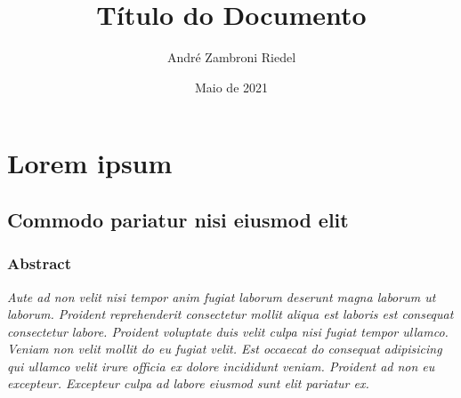 \documentclass[12pt]{report}
\begin{document}



\thispagestyle{empty}

\title{\textbf{{\Huge Título do Documento}}}
\author{André Zambroni Riedel}
\date{Maio de 2021}

\maketitle
\newpage



\tableofcontents
\newpage

\listoffigures
\newpage

\listoftables
\newpage


\setcounter{page}{1}

\part{Lorem ipsum}

\chapter{Commodo pariatur nisi eiusmod elit}

\singlespacing
\section*{Abstract}
\noindent
\textit{
    Aute ad non velit nisi tempor anim fugiat laborum deserunt magna laborum ut laborum. Proident reprehenderit consectetur mollit aliqua est laboris est consequat consectetur labore. Proident voluptate duis velit culpa nisi fugiat tempor ullamco. Veniam non velit mollit do eu fugiat velit. Est occaecat do consequat adipisicing qui ullamco velit irure officia ex dolore incididunt veniam. Proident ad non eu excepteur. Excepteur culpa ad labore eiusmod sunt elit pariatur ex.
}

\onehalfspacing
\setlength{\parindent}{1.5cm} %
\end{document}
